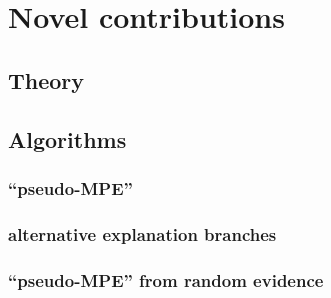 \section{Novel contributions}\label{sec:novel-contributions}
\subsection{Theory}


\subsection{Algorithms}
\subsubsection{\enquote{pseudo-MPE}}
\subsubsection{alternative explanation branches}
\subsubsection{\enquote{pseudo-MPE} from random evidence}